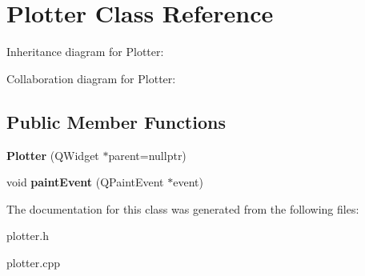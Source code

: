 \hypertarget{classPlotter}{}\section{Plotter Class Reference}
\label{classPlotter}


Inheritance diagram for Plotter\+:


Collaboration diagram for Plotter\+:
\subsection*{Public Member Functions}
\begin{DoxyCompactItemize}
\item 
\mbox{\label{classPlotter_a1807627530de30ae58dff3c42a823497}} 
{\bfseries Plotter} (Q\+Widget $\ast$parent=nullptr)
\item 
\mbox{\label{classPlotter_a06477bf987646f000a8982db1352a11d}} 
void {\bfseries paint\+Event} (Q\+Paint\+Event $\ast$event)
\end{DoxyCompactItemize}


The documentation for this class was generated from the following files\+:\begin{DoxyCompactItemize}
\item 
plotter.\+h\item 
plotter.\+cpp\end{DoxyCompactItemize}
